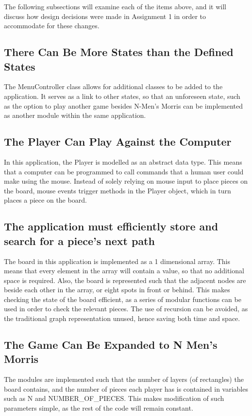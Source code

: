 \documentclass{article}
\begin{document}
{The following subsections will examine each of the items above, and it will discuss how design decisions were made in Assignment 1 in order to accommodate for these changes.

\subsection{There Can Be More States than the Defined States}
The MenuController class allows for additional classes to be added to the application. It serves as a link to other states, so that an unforeseen state, such as the option to play another game besides N-Men’s Morris can be implemented as another module within the same application.

\subsection{The Player Can Play Against the Computer}
In this application, the Player is modelled as an abstract data type. This means that a computer can be programmed to call commands that a human user could make using the mouse. Instead of solely relying on mouse input to place pieces on the board, mouse events trigger methods in the Player object, which in turn places a piece on the board. 

\subsection{The application must efficiently store and search for a piece's next path}
The board in this application is implemented as a 1 dimensional array. This means that every element in the array will contain a value, so that no additional space is required. Also, the board is represented such that the adjacent nodes are beside each other in the array, or eight spots in front or behind. This makes checking the state of the board efficient, as a series of modular functions can be used in order to check the relevant pieces. The use of recursion can be avoided, as the traditional graph representation unused, hence saving both time and space.

\subsection{The Game Can Be Expanded to N Men's Morris}
The modules are implemented such that the number of layers (of rectangles) the board contains, and the number of pieces each player has is contained in variables such as N and NUMBER\_OF\_PIECES. This makes modification of such parameters simple, as the rest of the code will remain constant. 


}
\end{document}

